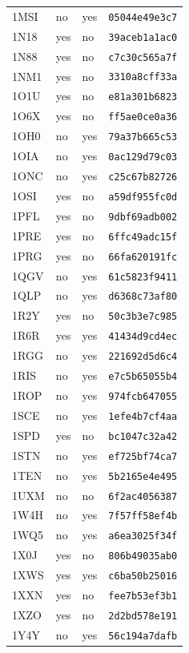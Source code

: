 \documentclass[11pt]{article}
\begin{document}
\begin{longtable}{llll}
1MSI & no & yes & \texttt{05044e49e3c7}\\
1N18 & yes & no & \texttt{39aceb1a1ac0}\\
1N88 & yes & no & \texttt{c7c30c565a7f}\\
1NM1 & yes & no & \texttt{3310a8cff33a}\\
1O1U & yes & no & \texttt{e81a301b6823}\\
1O6X & yes & no & \texttt{ff5ae0ce0a36}\\
1OH0 & no & yes & \texttt{79a37b665c53}\\
1OIA & no & yes & \texttt{0ac129d79c03}\\
1ONC & no & yes & \texttt{c25c67b82726}\\
1OSI & yes & no & \texttt{a59df955fc0d}\\
1PFL & yes & no & \texttt{9dbf69adb002}\\
1PRE & yes & no & \texttt{6ffc49adc15f}\\
1PRG & yes & no & \texttt{66fa620191fc}\\
1QGV & no & yes & \texttt{61c5823f9411}\\
1QLP & no & yes & \texttt{d6368c73af80}\\
1R2Y & yes & no & \texttt{50c3b3e7c985}\\
1R6R & yes & yes & \texttt{41434d9cd4ec}\\
1RGG & no & yes & \texttt{221692d5d6c4}\\
1RIS & no & yes & \texttt{e7c5b65055b4}\\
1ROP & no & yes & \texttt{974fcb647055}\\
1SCE & no & yes & \texttt{1efe4b7cf4aa}\\
1SPD & yes & no & \texttt{bc1047c32a42}\\
1STN & no & yes & \texttt{ef725bf74ca7}\\
1TEN & no & yes & \texttt{5b2165e4e495}\\
1UXM & no & no & \texttt{6f2ac4056387}\\
1W4H & no & yes & \texttt{7f57ff58ef4b}\\
1WQ5 & no & yes & \texttt{a6ea3025f34f}\\
1X0J & yes & no & \texttt{806b49035ab0}\\
1XWS & yes & yes & \texttt{c6ba50b25016}\\
1XXN & yes & no & \texttt{fee7b53ef3b1}\\
1XZO & yes & no & \texttt{2d2bd578e191}\\
1Y4Y & no & yes & \texttt{56c194a7dafb}\\

\end{longtable}
\end{document}
